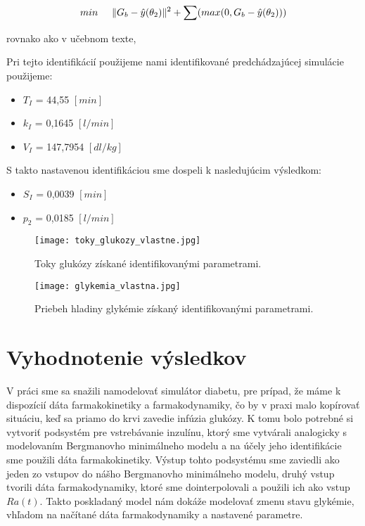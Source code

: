 \documentclass[11pt]{article} %
\begin{document}
\begin{equation}
 min \hspace{5mm} \| G_b - \hat{y}(\theta_2) \|^2 + \sum( max(0, G_b - \hat{y}(\theta_2) ))
\end{equation} 

rovnako ako v učebnom texte, 

Pri tejto identifikácií použijeme nami identifikované predchádzajúcej simulácie použijeme:
\begin{itemize}
\item $T_I$ = 44,55  $[min]$
\item $k_I$ = 0,1645 $[l/min]$ 
\item $V_I$ = 147,7954 $[dl/kg]$ 
\end{itemize}

S takto nastavenou identifikáciou sme dospeli k nasledujúcim výsledkom: 
\begin{itemize}
\item $S_I$ = 0,0039 $[min]$
\item $p_2$ = 0,0185 $[l/min]$ 
\end{itemize}

\begin{figure}[h] 
	\centering
	\texttt{[image: toky\_glukozy\_vlastne.jpg]} 
	\caption{Toky glukózy získané identifikovanými parametrami.}
	\label{fig:toky_glukozy}
\end{figure}

\begin{figure}
	\centering
	\texttt{[image: glykemia\_vlastna.jpg]} 
	\caption{Priebeh hladiny glykémie získaný identifikovanými parametrami.}
	\label{fig:hladina_glykemie}
\end{figure}

\vspace{45mm}

\section{Vyhodnotenie výsledkov}

V práci sme sa snažili namodelovať simulátor diabetu, pre prípad, že máme k dispozícií dáta farmakokinetiky a farmakodynamiky, čo by v praxi malo kopírovať situáciu, keď sa priamo do krvi zavedie infúzia glukózy. K tomu bolo potrebné si vytvoriť podsystém pre vstrebávanie inzulínu, ktorý sme vytvárali analogicky s modelovaním Bergmanovho minimálneho modelu a na účely jeho identifikácie sme použili dáta farmakokinetiky. Výstup tohto podsystému sme zaviedli ako jeden zo vstupov do nášho Bergmanovho minimálneho modelu, druhý vstup tvorili dáta farmakodynamiky, ktoré sme dointerpolovali a použili ich ako vstup $Ra(t)$. Takto poskladaný model nám dokáže modelovať zmenu stavu glykémie, vhľadom na načítané dáta farmakodynamiky a nastavené parametre.
\end{document}
